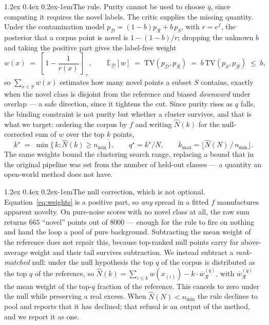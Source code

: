 \documentclass{article}
\makeatletter
\renewcommand\paragraph{\@startsection{paragraph}{4}{\z@}%
  {1.2ex \@plus 0.4ex \@minus 0.2ex}{-1em}{\normalsize\bf}}
\newcommand{\E}{\mathbb{E}}
\newcommand{\R}{\mathcal{R}}
\newcommand{\D}{\mathcal{D}}
\newcommand{\nmin}{n_{\min}}
\makeatother
\begin{document}
\paragraph{The rule.}
Purity cannot be used to choose $q$, since computing it requires the novel
labels. The critic supplies the missing quantity. Under the contamination
model $p_\D = (1-b) p_\R + b\, p_S$, with $r = e^{f}$, the posterior that a
corpus point is novel is $1 - (1-b)/r$; dropping the unknown $b$ and taking
the positive part gives the label-free weight
\begin{equation}
\label{eq:weights}
w(x) \;=\; \left[\,1 - \frac{1}{r(x)}\,\right]_{+},
\qquad
\E_\D[w] \;=\; \mathrm{TV}(p_\D, p_\R) \;=\; b\,\mathrm{TV}(p_S, p_\R) \;\le\; b ,
\end{equation}
so $\sum_{x \in S} w(x)$ estimates how many novel points a subset $S$
contains, exactly when the novel class is disjoint from the reference and
biased \emph{downward} under overlap --- a safe direction, since it tightens
the cut. Since purity rises as $q$ falls, the binding constraint is not purity
but whether a cluster survives, and that is what we target: ordering the
corpus by $f$ and writing $\widehat{N}(k)$ for the null-corrected sum of
$w$ over the top $k$ points,
\begin{equation}
\label{eq:rule}
k^\star \;=\; \min\big\{\,k : \widehat{N}(k) \ge \nmin \,\big\},
\qquad
q^\star = k^\star / N ,
\qquad
k_{\max} = \Big\lfloor \widehat{N}(N)\,/\,\nmin \Big\rfloor .
\end{equation}
The same weights bound the clustering search range, replacing a bound that in
the original pipeline was set from the number of held-out classes --- a
quantity an open-world method does not have.

\paragraph{The null correction, which is not optional.}
Equation~\ref{eq:weights} is a positive part, so \emph{any} spread in a fitted
$f$ manufactures apparent novelty. On pure-noise scores with no novel class at
all, the raw sum returns $665$ ``novel'' points out of $8000$ --- enough for
the rule to fire on nothing and hand the loop a pool of pure background.
Subtracting the mean weight of the reference does not repair this, because
top-ranked null points carry far above-average weight and their tail survives
subtraction. We instead subtract a \emph{rank-matched} null: under the null
hypothesis the top $q$ of the corpus is distributed as the top $q$ of the
reference, so
$\widehat{N}(k) = \sum_{i \le k} w(x_{(i)}) - k \cdot \overline{w}_{\R}^{(q)}$,
with $\overline{w}_{\R}^{(q)}$ the mean weight of the top-$q$ fraction of the
reference. This cancels to zero under the null while preserving a real excess.
When $\widehat{N}(N) < \nmin$ the rule declines to pool and reports that it has
declined; that refusal is an output of the method, and we report it as one.
\end{document}
